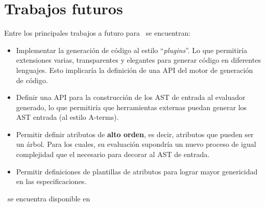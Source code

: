 \section{Trabajos futuros}
Entre los principales trabajos a futuro para \maggen\ se encuentran:
\begin{itemize}

\item Implementar la generación de código al estilo ``\textit{plugins}''. Lo que permitiría extensiones varias, transparentes y elegantes para generar código en dife\-rentes lenguajes. Esto implicaría la definición de una API del motor de ge\-neración de código.

\item Definir una API para la construcción de los AST de entrada al evaluador generado, lo que permitiría que herramientas externas puedan generar los AST entrada (al estilo A-terms).


\item Permitir definir atributos de \textbf{alto orden}, es decir, atributos que pueden ser un árbol. Para los cuales, su evaluación supondría un nuevo proceso de igual complejidad que el necesario para decorar al AST de entrada.

\item Permitir definiciones de plantillas de atributos para lograr mayor genericidad en las especificaciones.

\end{itemize}


\maggen\ se encuentra disponible en 